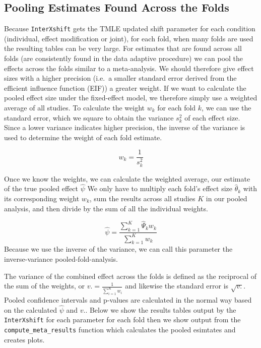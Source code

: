 \documentclass[
]{article}
\begin{document}
\hypertarget{pooling-estimates-found-across-the-folds}{%
\subsection{Pooling Estimates Found Across the
Folds}\label{pooling-estimates-found-across-the-folds}}

Because \texttt{InterXshift} gets the TMLE updated shift parameter for
each condition (individual, effect modification or joint), for each
fold, when many folds are used the resulting tables can be very large.
For estimates that are found across all folds (are consistently found in
the data adaptive procedure) we can pool the effects across the folds
similar to a meta-analysis. We should therefore give effect sizes with a
higher precision (i.e.~a smaller standard error derived from the
efficient influence function (EIF)) a greater weight. If we want to
calculate the pooled effect size under the fixed-effect model, we
therefore simply use a weighted average of all studies. To calculate the
weight \(w_k\) for each fold \(k\), we can use the standard error, which
we square to obtain the variance \(s^2_k\) of each effect size. Since a
lower variance indicates higher precision, the inverse of the variance
is used to determine the weight of each fold estimate.

\[w_k = \frac{1}{s^2_k}\]

Once we know the weights, we can calculate the weighted average, our
estimate of the true pooled effect \(\hat{\psi}\) We only have to
multiply each fold's effect size \(\hat{\theta}_k\) with its
corresponding weight \(w_k\), sum the results across all studies \(K\)
in our pooled analysis, and then divide by the sum of all the individual
weights.

\[\hat{\psi} = \frac{\sum_{k = 1}^K \hat{\Psi}_k w_k}{\sum_{k = 1}^K w_k}\]
Because we use the inverse of the variance, we can call this parameter
the inverse-variance pooled-fold-analysis.

The variance of the combined effect across the folds is defined as the
reciprocal of the sum of the weights, or
\(v. = \frac{1}{\sum_{i=1}^K w_i}\) and likewise the standard error is
\(\sqrt{v.}\). Pooled confidence intervals and p-values are calculated
in the normal way based on the calculated \(\hat{\psi}\) and \(v.\).
Below we show the results tables output by the \texttt{InterXshift} for
each parameter for each fold then we show output from the
\texttt{compute\_meta\_results} function which calculates the pooled
esimtates and creates plots.
\end{document}
